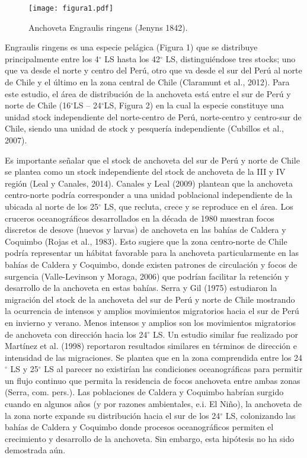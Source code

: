 
\begin{figure}[h]
    \centering
    \texttt{[image: figura1.pdf]}  
    \caption{Anchoveta Engraulis ringens (Jenyns 1842).}
    \label{fig:figure1}
\end{figure}  

Engraulis ringens es una especie pelágica (Figura 1) que se distribuye principalmente entre los 4$^\circ$ LS hasta los 42$^\circ$ LS, distinguiéndose tres stocks; uno que va desde el norte y centro del Perú, otro que va desde el sur del Perú al norte de Chile y el último en la zona central de Chile (Claramunt et al., 2012). Para este estudio, el área de distribución de la anchoveta está entre el sur de Perú y norte de Chile (16$^\circ$LS – 24$^\circ$LS, Figura 2) en la cual la especie constituye una unidad stock independiente del norte-centro de Perú, norte-centro y centro-sur de Chile, siendo una unidad de stock y pesquería independiente (Cubillos et al., 2007).
\newline

Es importante señalar que el stock de anchoveta del sur de Perú y norte de Chile se plantea como un stock independiente del stock de anchoveta de la III y IV región (Leal y Canales, 2014). Canales y Leal (2009) plantean que la anchoveta centro-norte podría corresponder a una unidad poblacional independiente de la ubicada al norte de los 25$^\circ$ LS, que recluta, crece y se reproduce en el área. Los cruceros oceanográficos desarrollados en la década de 1980 muestran focos discretos de desove (huevos y larvas) de anchoveta en las bahías de Caldera y Coquimbo (Rojas et al., 1983). Esto sugiere que la zona centro-norte de Chile podría representar un hábitat favorable para la anchoveta particularmente en las bahías de Caldera y Coquimbo, donde existen patrones de circulación y focos de surgencia (Valle-Levinson y Moraga, 2006) que podrían facilitar la retención y desarrollo de la anchoveta en estas bahías. Serra y Gil (1975) estudiaron la migración del stock de la anchoveta del sur de Perú y norte de Chile mostrando la ocurrencia de intensos y amplios movimientos migratorios hacia el sur de Perú en invierno y verano. Menos intensos y amplios son los movimientos migratorios de anchoveta con dirección hacia los 24$^\circ$ LS. Un estudio similar fue realizado por Martínez et al. (1998) reportaron resultados similares en términos de dirección e intensidad de las migraciones. Se plantea que en la zona comprendida entre los 24$^\circ$ LS y 25$^\circ$ LS al parecer no existirían las condiciones oceanográficas para permitir un flujo continuo que permita la residencia de focos anchoveta entre ambas zonas (Serra, com. pers.). Las poblaciones de Caldera y Coquimbo habrían surgido cuando en algunos años (y por razones ambientales, e.i. El Niño), la anchoveta de la zona norte expande su distribución hacia el sur de los 24$^\circ$ LS, colonizando las bahías de Caldera y Coquimbo donde procesos oceanográficos permiten el crecimiento y desarrollo de la anchoveta. Sin embargo, esta hipótesis no ha sido demostrada aún.

